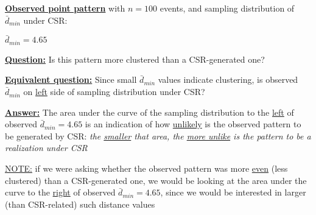 \documentclass[portrait]{seminar}
\begin{document}
%
%
\begin{slide*}
\begin{center}
 \vspace*{-0.6cm} 
\end{center}
 \vspace{0.2cm}

\underline{\textbf{Observed point pattern}} with $n=100$ events, and
sampling distribution of $\bar{d}_{min}$ under CSR:

\begin{center}
\begin{figure}
 \hspace{0.5cm}
\end{figure}
\end{center}
\vspace{-0.5cm} {\small \hspace{1.45cm} $\bar{d}_{min} = 4.65$}

\vspace{0.2cm}\underline{\textbf{Question:}} Is this pattern more
clustered than a CSR-generated one?

\vspace{0.2cm}\underline{\textbf{Equivalent question:}} Since small
$\bar{d}_{min}$ values indicate clustering, is observed
$\bar{d}_{min}$ on \underline{left} side of sampling distribution
under CSR?

\vspace{0.2cm}\underline{\textbf{Answer:}} The area under the curve
of the sampling distribution to the \underline{left} of observed
$\bar{d}_{min}=4.65$ is an indication of how \underline{unlikely} is
the observed pattern to be generated by CSR: \emph{the
\underline{smaller} that area, the \underline{more unlike} is the
pattern to be a realization under CSR}

{\small \underline{NOTE:} if we were asking whether the observed
pattern was more \underline{even} (less clustered) than a
CSR-generated one, we would be looking at the area under the curve
to the \underline{right} of observed $\bar{d}_{min}=4.65$, since we
would be interested in larger (than CSR-related) such distance
values}

\end{slide*}
\end{document}
